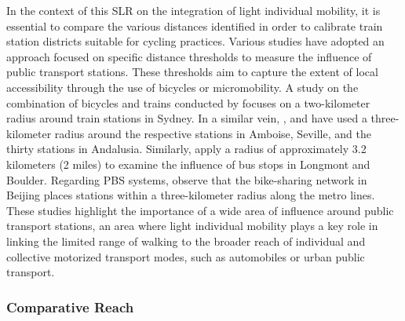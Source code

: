 \begin{refsegment}
In the context of this \acrshort{SLR} on the integration of light individual mobility, it is essential to compare the various distances identified in order to calibrate train station districts suitable for cycling practices. Various studies have adopted an approach focused on specific distance thresholds to measure the influence of public transport stations. These thresholds aim to capture the extent of local accessibility through the use of bicycles or micromobility. A study on the combination of bicycles and trains conducted by \textcolor{blue}{\textcite[6]{zhang_make_2023}} focuses on a two-kilometer radius around train stations in Sydney. In a similar vein, \textcolor{blue}{\textcite[15]{papon_rapport_2015}}, \textcolor{blue}{\textcite[30]{marques_potential_2017}} and \textcolor{blue}{\textcite[193]{garcia-bello_methodological_2019}} have used a three-kilometer radius around the respective stations in Amboise, Seville, and the thirty stations in Andalusia. Similarly, \textcolor{blue}{\textcite[165]{krizek_bicycling_2010}} apply a radius of approximately 3.2 kilometers (2 miles) to examine the influence of bus stops in Longmont and Boulder. Regarding \acrshort{PBS} systems, \textcolor{blue}{\textcite[77]{liu_solving_2012}} observe that the bike-sharing network in Beijing places stations within a three-kilometer radius along the metro lines. These studies highlight the importance of a wide area of influence around public transport stations, an area where light individual mobility plays a key role in linking the limited range of walking to the broader reach of individual and collective motorized transport modes, such as automobiles or urban public transport.%

\subsubsection*{Comparative Reach
    \label{chap2:portee-comparee}
    }


\end{refsegment}
